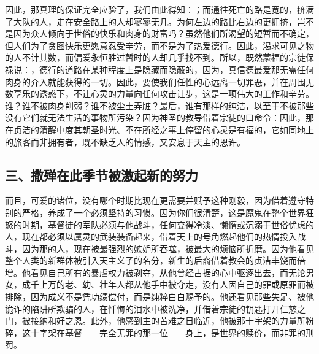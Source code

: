 因此，那真理的保证完全应验了，我们由此得知：；而通往死亡的路是宽的，挤满了大队的人，走在安全路上的人却寥寥无几。为何左边的路比右边的更拥挤，岂不是因为众人倾向于世俗的快乐和肉身的财富吗？虽然他们所渴望的短暂而不确定，但人们为了贪图快乐更愿意忍受辛劳，而不是为了热爱德行。因此，渴求可见之物的人不计其数，而偏爱永恒胜过暂时的人却几乎找不到。所以，既然蒙福的宗徒保禄说：，德行的道路在某种程度上是隐藏而隐蔽的，因为，真信德最爱那无需任何肉身的介入就能获得的一切。因此，要使我们任性的心远离一切罪恶，并在周围无数享乐的诱惑下，不让心灵的力量向任何攻击让步，这是一项伟大的工作和辛劳。谁？谁不被肉身削弱？谁不被尘土弄脏？最后，谁有那样的纯洁，以至于不被那些没有它们就无法生活的事物所污染？因为神圣的教导借着宗徒的口命令：因此，那在贞洁的清醒中度其朝圣时光、不在所经之事上停留的心灵是有福的，它如同地上的旅客而非拥有者，既不缺乏人的情感，又安息于天主的恩许。\par


\subsection{三、撒殚在此季节被激起新的努力}

而且，可爱的诸位，没有哪个时期比现在更需要并赋予这种刚毅，因为借着遵守特别的严格，养成了一个必须坚持的习惯。因为你们很清楚，这是魔鬼在整个世界狂怒的时期，基督徒的军队必须与他战斗，任何变得冷淡、懒惰或沉溺于世俗忧虑的人，现在都必须以属灵的武装装备起来，借着天上的号角燃起他们的热情投入战斗，因为那的人，现在被最强烈的嫉妒所吞噬，被最大的烦恼所折磨。因为他看见整个人类的新群体被引入天主义子的名分，新生的后裔借着教会的贞洁丰饶而倍增。他看见自己所有的暴虐权力被剥夺，从他曾经占据的心中驱逐出去，而无论男女，成千上万的老、幼、壮年人都从他手中被夺走，没有人因自己的罪或原罪而被排除，因为成义不是凭功绩偿付，而是纯粹白白赐予的。他还看见那些失足、被他诡诈的陷阱所欺骗的人，在忏悔的泪水中被洗净，并借着宗徒的钥匙打开仁慈之门，被接纳和好之恩。此外，他感到主的苦难之日临近，他被那十字架的力量所粉碎，这十字架在基督——完全无罪的那一位——身上，是世界的赎价，而非罪的刑罚。\par

